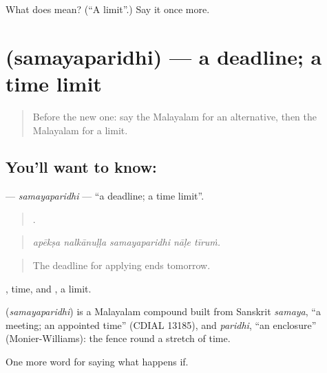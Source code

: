 \begin{tcolorbox}[breakable,colback=teal!4,colframe=teal!35!black,title={Before you move on}]
What does  mean? (\textquotedblleft{}A limit\textquotedblright{}.) Say it once more.
\end{tcolorbox}
\section[\texorpdfstring{\ml{സമയപരിധി} (samayaparidhi)}{സമയപരിധി (samayaparidhi)}]{ (samayaparidhi) — a deadline; a time limit}

\label{lesson:ML-C443-samayaparidhi}



\begin{quote}
Before the new one: say the Malayalam for an alternative, then the Malayalam for a limit.
\end{quote}

\subsection*{You'll want to know: }
\textbf{} — \emph{samayaparidhi} — \textquotedblleft{}a deadline; a time limit\textquotedblright{}.

\begin{quote}
    .
\end{quote}

\begin{quote}
\emph{apēkṣa nalkānuḷḷa samayaparidhi nāḷe tīruṁ.}
\end{quote}

\begin{quote}
The deadline for applying ends tomorrow.
\end{quote}

, time, and , a limit.

\begin{cousinweb}
\textbf{} (\emph{samayaparidhi}) is a Malayalam compound built from Sanskrit \emph{samaya}, \textquotedblleft{}a meeting; an appointed time\textquotedblright{} (CDIAL 13185), and \emph{paridhi}, \textquotedblleft{}an enclosure\textquotedblright{} (Monier-Williams): the fence round a stretch of time.
\end{cousinweb}

\begin{grammarlens}[title={What you've built}]
One more word for saying what happens if.
\end{grammarlens}

